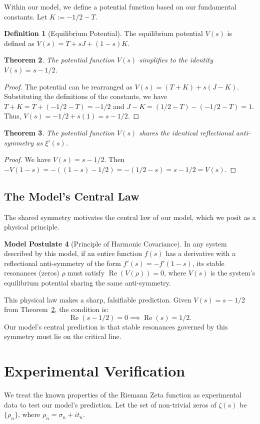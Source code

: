 \documentclass{amsart}
\theoremstyle{plain}
\newtheorem{theorem}{Theorem}
\theoremstyle{definition}
\newtheorem{definition}[theorem]{Definition}
\newtheorem{modelpostulate}[theorem]{Model Postulate}
\theoremstyle{remark}
\DeclareMathOperator{\re}{Re}
\begin{document}
Within our model, we define a potential function based on our fundamental constants. Let $K := -1/2 - T$.
\begin{definition}[Equilibrium Potential]
The equilibrium potential $V(s)$ is defined as $V(s) = T + sJ + (1-s)K$.
\end{definition}

\begin{theorem}\label{thm:potential_id}
The potential function $V(s)$ simplifies to the identity $V(s) = s - 1/2$.
\end{theorem}
\begin{proof}
The potential can be rearranged as $V(s) = (T+K) + s(J-K)$. Substituting the definitions of the constants, we have $T+K = T + (-1/2 - T) = -1/2$ and $J-K = (1/2 - T) - (-1/2-T) = 1$. Thus, $V(s) = -1/2 + s(1) = s - 1/2$.
\end{proof}

\begin{theorem}\label{thm:potential_symm}
The potential function $V(s)$ shares the identical reflectional anti-symmetry as $\xi'(s)$.
\end{theorem}
\begin{proof}
We have $V(s) = s-1/2$. Then $-V(1-s) = -((1-s)-1/2) = -(1/2-s) = s-1/2 = V(s)$.
\end{proof}

\subsection{The Model's Central Law}
The shared symmetry motivates the central law of our model, which we posit as a physical principle.

\begin{modelpostulate}[Principle of Harmonic Covariance]\label{post:covariance}
In any system described by this model, if an entire function $f(s)$ has a derivative with a reflectional anti-symmetry of the form $f'(s)=-f'(1-s)$, its stable resonances (zeros) $\rho$ must satisfy $\re(V(\rho))=0$, where $V(s)$ is the system's equilibrium potential sharing the same anti-symmetry.
\end{modelpostulate}

This physical law makes a sharp, falsifiable prediction. Given $V(s)=s-1/2$ from Theorem~\ref{thm:potential_id}, the condition is:
\[ \re(s - 1/2) = 0 \implies \re(s) = 1/2. \]
Our model's central prediction is that stable resonances governed by this symmetry must lie on the critical line.

\section{Experimental Verification}
We treat the known properties of the Riemann Zeta function as experimental data to test our model's prediction. Let the set of non-trivial zeros of $\zeta(s)$ be $\{\rho_n\}$, where $\rho_n = \sigma_n + it_n$.
\end{document}
